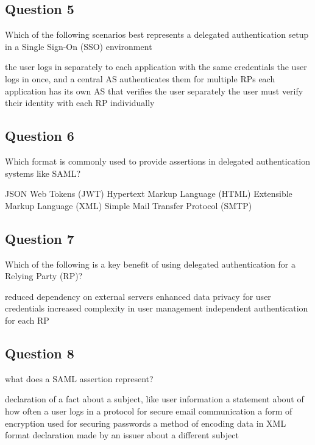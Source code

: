 \subsection*{Question 5}
Which of the following scenarios best represents a delegated authentication setup in a Single Sign-On (SSO) environment
\begin{itemize}
  \incorrect  the user logs in separately to each application with the same credentials
  \correct the user logs in once, and a central AS authenticates them for multiple RPs
  \incorrect each application has its own AS that verifies the user separately
  \incorrect the user must verify their identity with each RP individually
\end{itemize}

\subsection*{Question 6}
Which format is commonly used to provide assertions in delegated authentication systems like SAML?
\begin{itemize}
  \incorrect  JSON Web Tokens (JWT)
  \incorrect  Hypertext Markup Language (HTML) 
  \correct  Extensible Markup Language (XML) 
  \incorrect  Simple Mail Transfer Protocol (SMTP)
\end{itemize}

\subsection*{Question 7}
Which of the following is a key benefit of using delegated authentication for a Relying Party (RP)?
\begin{itemize}
  \incorrect  reduced dependency on external servers 
  \correct  enhanced data privacy for user credentials 
  \incorrect  increased complexity in user management 
  \incorrect  independent authentication for each RP
\end{itemize}

\subsection*{Question 8}
what does a SAML assertion represent?
\begin{itemize}
  \correct  declaration of a fact about a subject, like user information
  \incorrect  a statement about of how often a user logs in
  \incorrect  a protocol for secure email communication
  \incorrect  a form of encryption used for securing passwords
  \incorrect  a method of encoding data in XML format
  \correct  declaration made by an issuer about a different subject
\end{itemize}

